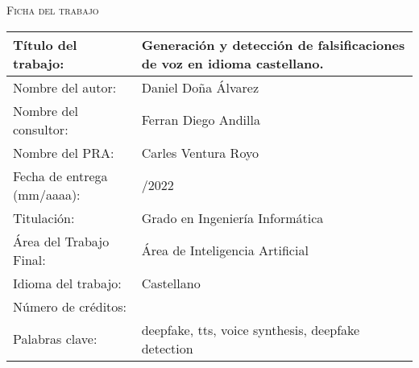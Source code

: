 \thispagestyle{empty}

{\scshape\large Ficha del trabajo \par}
\vspace{0.5cm}

\def\arraystretch{2}
\begin{center}
\begin{tabularx}{1\textwidth} { 
  | >{\raggedleft\arraybackslash}X
  | >{\raggedright\arraybackslash}X | }
\hline
Título del trabajo: & Generación y detección de falsificaciones de voz en idioma castellano. \\
\hline
Nombre del autor: & Daniel Doña Álvarez  \\
\hline
Nombre del consultor: & Ferran Diego Andilla \\
\hline
Nombre del PRA: & Carles Ventura Royo \\
\hline
Fecha de entrega (mm/aaaa): & 06/2022 \\
\hline
Titulación: & Grado en Ingeniería Informática \\
\hline
Área del Trabajo Final: & Área de Inteligencia Artificial \\
\hline
Idioma del trabajo: & Castellano \\
\hline
Número de créditos: & 12 \\
\hline
Palabras clave: & deepfake, tts, voice synthesis, deepfake detection \\
\hline

\end{tabularx}
\end{center}

\newpage
\thispagestyle{empty}

